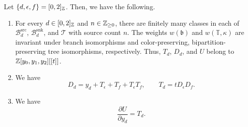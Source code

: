 \begin{lemma}\label{lem:branch-series}
Let $\{d,\epsilon,f\}=[0,2]_{\mathbb Z}$.
Then, we have the following.
\begin{enumerate}
\item\label{c:slots-finite} For every $d\in[0,2]_{\mathbb Z}$ and $n\in\mathbb Z_{\ge0}$, there are finitely many classes in each of
$\mathcal B_d^{\mathrm{src}}$, $\mathcal B_d^{\mathrm{snk}}$, and $\mathcal T$ with source count $n$.
The weights $w(\mathfrak b)$ and $w(\mathbb T,\kappa)$ are invariant under branch isomorphisms and color-preserving, bipartition-preserving tree isomorphisms, respectively.
Thus, $T_d$, $D_d$, and $U$ belong to $\mathbb Z[y_0,y_1,y_2][[t]]$.
\item\label{c:branch-series-recursions} We have
\begin{equation}\label{eq:marked-branch-series}
D_d=y_d+T_\epsilon+T_f+T_\epsilon T_f,\qquad T_d=tD_\epsilon D_f.
\end{equation}
\item\label{c:branch-series-leaf} We have
\[
 \frac{\partial U}{\partial y_d}=T_d.
\]
\end{enumerate}
\end{lemma}

